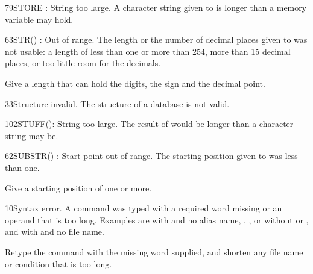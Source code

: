 \begin{XbaseMessageEntry}{79}{STORE : String too large.}
A character string given to  is longer than a memory variable may hold.
\end{XbaseMessageEntry}

\begin{XbaseMessageEntry}{63}{STR() : Out of range.}
The length or the number of decimal places given to  was not usable: a length of less than one or more than 254, more than 15 decimal places, or too little room for the decimals.

Give a length that can hold the digits, the sign and the decimal point.
\end{XbaseMessageEntry}

\begin{XbaseMessageEntry}{33}{Structure invalid.}
The structure of a database is not valid.
\end{XbaseMessageEntry}

\begin{XbaseMessageEntry}{102}{STUFF():  String too large.}
The result of  would be longer than a character string may be.
\end{XbaseMessageEntry}

\begin{XbaseMessageEntry}{62}{SUBSTR() : Start point out of range.}
The starting position given to  was less than one.

Give a starting position of one or more.
\end{XbaseMessageEntry}

\begin{XbaseMessageEntry}{10}{Syntax error.}
A command was typed with a required word missing or an operand that is too long. Examples are  with  and no alias name, , ,  or  without  or , and  with  and no file name.

Retype the command with the missing word supplied, and shorten any file name or condition that is too long.
\end{XbaseMessageEntry}

